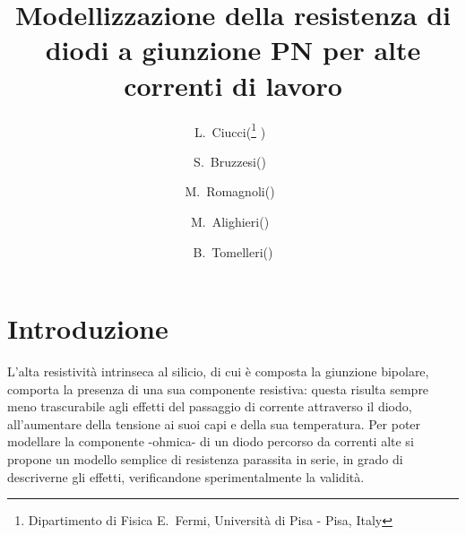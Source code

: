 \documentclass{article}[a4paper, oneside, 11pt]
\title{Modellizzazione della resistenza di diodi a giunzione PN per alte 
correnti di lavoro}
\author{L.~Ciucci(\thanks{Dipartimento di Fisica E.~Fermi, Universit\`a di Pisa 
- Pisa, Italy} )~\and S.~Bruzzesi(\protect\footnotemark[1] )~\and 
M.~Romagnoli(\protect\footnotemark[1] )~\and 
M.~Alighieri(\protect\footnotemark[1] )~\and 
B.~Tomelleri(\protect\footnotemark[1] )}
\begin{document}
\maketitle



\section{Introduzione}
L'alta resistività intrinseca al silicio, di cui è composta la giunzione
bipolare, comporta la presenza di una sua componente resistiva: questa 
risulta sempre meno trascurabile agli effetti del passaggio di corrente
attraverso il diodo, all'aumentare della tensione ai suoi capi e della sua 
temperatura. Per poter modellare la componente -ohmica- di un diodo
percorso da correnti alte si propone un modello semplice di resistenza
parassita in serie, in grado di descriverne gli effetti, verificandone 
sperimentalmente la validità.


\end{document}

